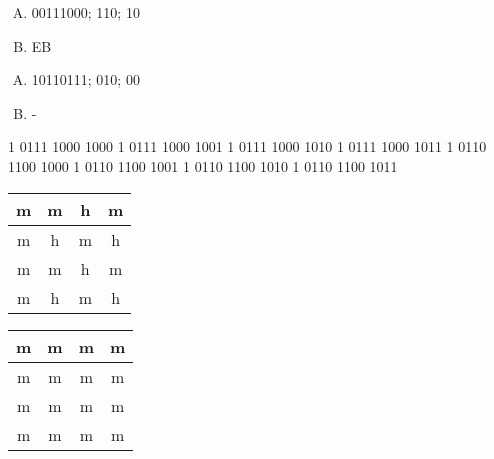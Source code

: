 {    %
    \begin{practicec}
        \begin{enumerate}[A.]
            \item 00111000; 110; 10
            \item EB
        \end{enumerate}
    \end{practicec}

    \begin{practicec}
        \begin{enumerate}[A.]
            \item 10110111; 010; 00
            \item -
        \end{enumerate}
    \end{practicec}

    \begin{practicec}
        1 0111 1000 1000
        1 0111 1000 1001
        1 0111 1000 1010
        1 0111 1000 1011
        1 0110 1100 1000
        1 0110 1100 1001
        1 0110 1100 1010
        1 0110 1100 1011
    \end{practicec}

    \begin{practicec}
        \begin{table}[htb]
            \begin{tabular}{|c|c|c|c|}
                \hline
                m & m & h & m \\
                \hline
                m & h & m & h \\
                \hline
                m & m & h & m \\
                \hline
                m & h & m & h \\
                \hline
            \end{tabular}
        \end{table}

        \begin{table}[htb]
            \begin{tabular}{|c|c|c|c|}
                \hline
                m & m & m & m \\
                \hline
                m & m & m & m \\
                \hline
                m & m & m & m \\
                \hline
                m & m & m & m \\
                \hline
            \end{tabular}
        \end{table}
    \end{practicec}

}
